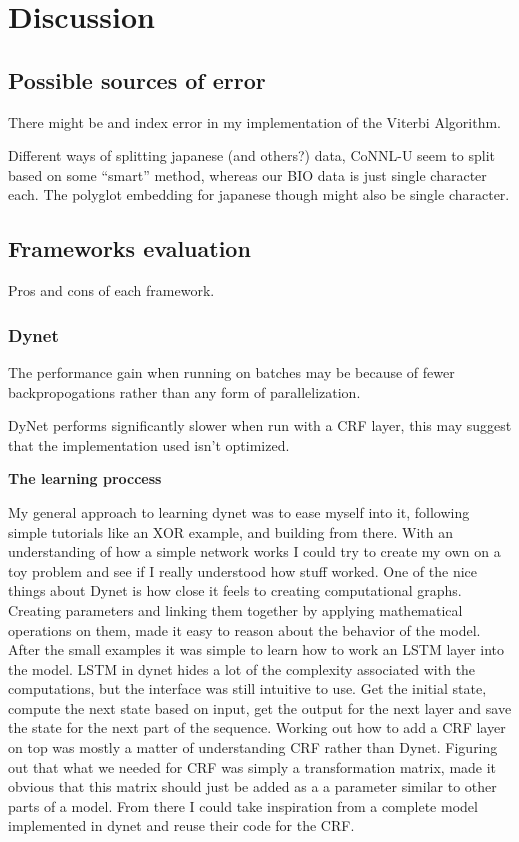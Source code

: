 
\section{Discussion}

\subsection{Possible sources of error}

There might be and index error in my implementation of the Viterbi Algorithm.

Different ways of splitting japanese (and others?) data, CoNNL-U seem to split
based on some ``smart'' method, whereas our BIO data is just single character
each. The polyglot embedding for japanese though might also be single character.

\subsection{Frameworks evaluation}
\label{subsec:frameworks}

Pros and cons of each framework.

\subsubsection{Dynet}

The performance gain when running on batches may be because of fewer
backpropogations rather than any form of parallelization.

DyNet performs significantly slower when run with a CRF layer, this may suggest
that the implementation used isn't optimized. 



\textbf{The learning proccess}

My general approach to learning dynet was to ease myself into it, following
simple tutorials like an XOR example, and building from there. With an
understanding of how a simple network works I could try to create my own on a
toy problem and see if I really understood how stuff worked. One of the nice
things about Dynet is how close it feels to creating computational graphs.
Creating parameters and linking them together by applying mathematical
operations on them, made it easy to reason about the behavior of the model.
After the small examples it was simple to learn how to work an LSTM layer into
the model. LSTM in dynet hides a lot of the complexity associated with the
computations, but the interface was still intuitive to use. Get the initial
state, compute the next state based on input, get the output for the next layer
and save the state for the next part of the sequence. Working out how to add a
CRF layer on top was mostly a matter of understanding CRF rather than Dynet.
Figuring out that what we needed for CRF was simply a transformation matrix,
made it obvious that this matrix should just be added as a a parameter similar
to other parts of a model. From there I could take inspiration from a complete
model implemented in dynet and reuse their code for the CRF.


